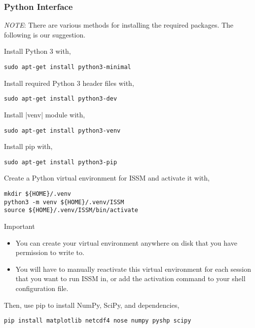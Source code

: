 \label{sec:linux-python-interface}
\subsubsection{Python Interface}
\emph{NOTE}: There are various methods for installing the required packages. The following is our suggestion.

Install Python 3 with,
\begin{lstlisting}
sudo apt-get install python3-minimal
\end{lstlisting}
Install required Python 3 header files with,
\begin{lstlisting}
sudo apt-get install python3-dev
\end{lstlisting}
Install \lstinlinebg|venv| module with,
\begin{lstlisting}
sudo apt-get install python3-venv
\end{lstlisting}
Install pip with,
\begin{lstlisting}
sudo apt-get install python3-pip
\end{lstlisting}
Create a Python virtual environment for ISSM and activate it with,
\begin{lstlisting}
mkdir ${HOME}/.venv
python3 -m venv ${HOME}/.venv/ISSM
source ${HOME}/.venv/ISSM/bin/activate
\end{lstlisting}

\begin{calloutHighlight}{Important}
\begin{itemize}
	\item You can create your virtual environment anywhere on disk that you have permission to write to.
	\item You will have to manually reactivate this virtual environment for each session that you want to run ISSM in, or add the activation command to your shell configuration file.
\end{itemize}
\end{calloutHighlight}

Then, use pip to install NumPy, SciPy, and dependencies,
\begin{lstlisting}
pip install matplotlib netcdf4 nose numpy pyshp scipy
\end{lstlisting}

